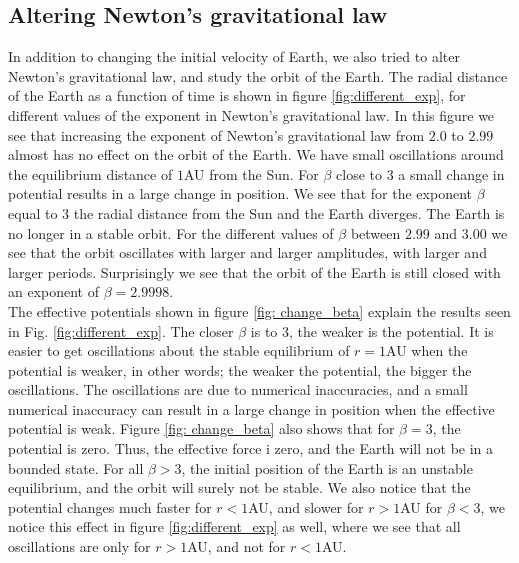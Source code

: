 \documentclass[%
 reprint,
nofootinbib,
aps,
]{revtex4-1}
\begin{document}
\subsection{Altering Newton's gravitational law}
In addition to changing the initial velocity of Earth, we also tried to alter Newton's gravitational law, and study the orbit of the Earth. The radial distance of the Earth as a function of time is shown in figure \vref{fig:different_exp}, for different values of the exponent in Newton's gravitational law. In this figure we see that increasing the exponent of Newton's gravitational law from $2.0$ to $2.99$ almost has no effect on the orbit of the Earth. We have small oscillations around the equilibrium distance of $1$AU from the Sun. For $\beta$ close to $3$ a small change in potential results in a large change in position. We see that for the exponent $\beta$ equal to $3$ the radial distance from the Sun and the Earth diverges. The Earth is no longer in a stable orbit. For the different values of $\beta$ between $2.99$ and $3.00$ we see that the orbit oscillates with larger and larger amplitudes, with larger and larger periods. Surprisingly we see that the orbit of the Earth is still closed with an exponent of $\beta=2.9998$. \\
The effective potentials shown in figure \vref{fig: change_beta} explain the results seen in Fig. \vref{fig:different_exp}. The closer $\beta$ is to $3$, the weaker is the potential. It is easier to get oscillations about the stable equilibrium of $r=1$AU when the potential is weaker, in other words; the weaker the potential, the bigger the oscillations. The oscillations are due to numerical inaccuracies, and a small numerical inaccuracy can result in a large change in position when the effective potential is weak.
Figure \vref{fig: change_beta} also shows that for $\beta=3$, the potential is zero. Thus, the effective force i zero, and the Earth will not be in a bounded state. For all $\beta > 3$, the initial position of the Earth is an unstable equilibrium, and the orbit will surely not be stable. We also notice that the potential changes much faster for $r<1$AU, and slower for $r>1$AU for $\beta<3$, we notice this effect in figure \vref{fig:different_exp} as well, where we see that all oscillations are only for $r>1$AU, and not for $r<1$AU.
\end{document}
